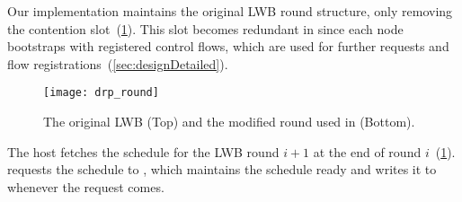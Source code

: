 Our implementation maintains the original LWB round structure, only removing the contention slot~(\cref{fig:drp_round}). This slot becomes redundant in \DRP since each node bootstraps with registered control flows, which are used for further \DRP requests and flow registrations~(\cref{sec:designDetailed}).

\begin{figure}
  \centering
  \texttt{[image: drp\_round]}
  \caption{The original LWB (Top) and the modified round used in \DRP (Bottom).
  }
  \label{fig:drp_round}
\end{figure}

The host \CP fetches the schedule for the LWB round $i+1$ at the end of round $i$~(\cref{fig:drp_round}).
\CP requests the schedule to \AP, which maintains the schedule ready and writes it to \bolt whenever the request comes.

